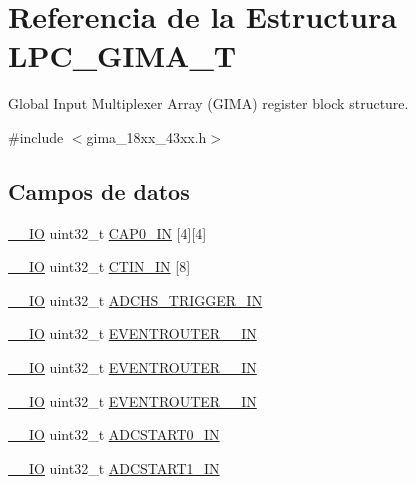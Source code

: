 \hypertarget{struct_l_p_c___g_i_m_a___t}{}\section{Referencia de la Estructura L\+P\+C\+\_\+\+G\+I\+M\+A\+\_\+T}
\label{struct_l_p_c___g_i_m_a___t}


Global Input Multiplexer Array (G\+I\+MA) register block structure.  




{\ttfamily \#include $<$gima\+\_\+18xx\+\_\+43xx.\+h$>$}

\subsection*{Campos de datos}
\begin{DoxyCompactItemize}
\item 
\hyperlink{core__sc300_8h_aec43007d9998a0a0e01faede4133d6be}{\+\_\+\+\_\+\+IO} uint32\+\_\+t \hyperlink{struct_l_p_c___g_i_m_a___t_ac4bf5433d58f70d1e052a2280feb6b32}{C\+A\+P0\+\_\+\+IN} \mbox{[}4\mbox{]}\mbox{[}4\mbox{]}
\item 
\hyperlink{core__sc300_8h_aec43007d9998a0a0e01faede4133d6be}{\+\_\+\+\_\+\+IO} uint32\+\_\+t \hyperlink{struct_l_p_c___g_i_m_a___t_ae01400d9b9f4cd89700413fe60c7c1d0}{C\+T\+I\+N\+\_\+\+IN} \mbox{[}8\mbox{]}
\item 
\hyperlink{core__sc300_8h_aec43007d9998a0a0e01faede4133d6be}{\+\_\+\+\_\+\+IO} uint32\+\_\+t \hyperlink{struct_l_p_c___g_i_m_a___t_a402df8694f8b3f4840c01a87aa8530b8}{A\+D\+C\+H\+S\+\_\+\+T\+R\+I\+G\+G\+E\+R\+\_\+\+IN}
\item 
\hyperlink{core__sc300_8h_aec43007d9998a0a0e01faede4133d6be}{\+\_\+\+\_\+\+IO} uint32\+\_\+t \hyperlink{struct_l_p_c___g_i_m_a___t_ae0a40fafbcc2634d80a4601c9f831a2d}{E\+V\+E\+N\+T\+R\+O\+U\+T\+E\+R\+\_\+\_\+\+IN}
\item 
\hyperlink{core__sc300_8h_aec43007d9998a0a0e01faede4133d6be}{\+\_\+\+\_\+\+IO} uint32\+\_\+t \hyperlink{struct_l_p_c___g_i_m_a___t_a45f362c92ddf24199bfaa0bfe0b3193b}{E\+V\+E\+N\+T\+R\+O\+U\+T\+E\+R\+\_\+\_\+\+IN}
\item 
\hyperlink{core__sc300_8h_aec43007d9998a0a0e01faede4133d6be}{\+\_\+\+\_\+\+IO} uint32\+\_\+t \hyperlink{struct_l_p_c___g_i_m_a___t_ae0528f872252b965ea76fb4315eea4e8}{E\+V\+E\+N\+T\+R\+O\+U\+T\+E\+R\+\_\+\_\+\+IN}
\item 
\hyperlink{core__sc300_8h_aec43007d9998a0a0e01faede4133d6be}{\+\_\+\+\_\+\+IO} uint32\+\_\+t \hyperlink{struct_l_p_c___g_i_m_a___t_a370eea1cefafc9d083c4794bc893d906}{A\+D\+C\+S\+T\+A\+R\+T0\+\_\+\+IN}
\item 
\hyperlink{core__sc300_8h_aec43007d9998a0a0e01faede4133d6be}{\+\_\+\+\_\+\+IO} uint32\+\_\+t \hyperlink{struct_l_p_c___g_i_m_a___t_a3b18edfdc46f7cda6d9e2f258cb1ef39}{A\+D\+C\+S\+T\+A\+R\+T1\+\_\+\+IN}
\end{DoxyCompactItemize}



